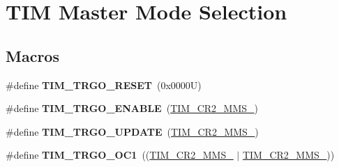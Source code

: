 \hypertarget{group___t_i_m___master___mode___selection}{}\section{T\+IM Master Mode Selection}
\label{group___t_i_m___master___mode___selection}
\subsection*{Macros}
\begin{DoxyCompactItemize}
\item 
\mbox{\label{group___t_i_m___master___mode___selection_ga32a8e436f2c0818a657b0d3fcf4e872d}} 
\#define {\bfseries T\+I\+M\+\_\+\+T\+R\+G\+O\+\_\+\+R\+E\+S\+ET}~(0x0000\+U)
\item 
\mbox{\label{group___t_i_m___master___mode___selection_ga4ac300b0fd24d1e6532e5961680a39a9}} 
\#define {\bfseries T\+I\+M\+\_\+\+T\+R\+G\+O\+\_\+\+E\+N\+A\+B\+LE}~(\hyperlink{group___peripheral___registers___bits___definition_gaf3e55308e84106d6501201e66bd46ab6}{T\+I\+M\+\_\+\+C\+R2\+\_\+\+M\+M\+S\+\_})
\item 
\mbox{\label{group___t_i_m___master___mode___selection_ga27521aebd507e562fe7fba6dfc639a67}} 
\#define {\bfseries T\+I\+M\+\_\+\+T\+R\+G\+O\+\_\+\+U\+P\+D\+A\+TE}~(\hyperlink{group___peripheral___registers___bits___definition_ga4b1036929b0a4ba5bd5cced9b8e0f4c3}{T\+I\+M\+\_\+\+C\+R2\+\_\+\+M\+M\+S\+\_})
\item 
\mbox{\label{group___t_i_m___master___mode___selection_ga80aa9a9c41de509d99fc4cb492d6513f}} 
\#define {\bfseries T\+I\+M\+\_\+\+T\+R\+G\+O\+\_\+\+O\+C1}~((\hyperlink{group___peripheral___registers___bits___definition_ga4b1036929b0a4ba5bd5cced9b8e0f4c3}{T\+I\+M\+\_\+\+C\+R2\+\_\+\+M\+M\+S\+\_} $\vert$ \hyperlink{group___peripheral___registers___bits___definition_gaf3e55308e84106d6501201e66bd46ab6}{T\+I\+M\+\_\+\+C\+R2\+\_\+\+M\+M\+S\+\_}))
\item 
\mbox{\label{group___t_i_m___master___mode___selection_gaed715aa7ec4ad0f7f5d82dde6d964178}} 

\end{DoxyCompactItemize}
